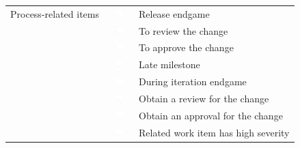 \begin{table}[t!]
\centering
\begin{tabular}{rll}
\toprule
Process-related items &\vspace{-2pt}\includegraphics[height=10px, width=30px]{figures/sparkles/during-release-endgame.pdf} & Release endgame\\
&\vspace{-2pt}\includegraphics[height=10px, width=30px]{figures/sparkles/you-need-to-review-a-change.pdf} & To review the change\\
&\vspace{-2pt}\includegraphics[height=10px, width=30px]{figures/sparkles/you-need-to-approve-a-change.pdf} & To approve the change\\
&\vspace{-2pt}\includegraphics[height=10px, width=30px]{figures/sparkles/late-milestone.pdf} & Late milestone\\
&\vspace{-2pt}\includegraphics[height=10px, width=30px]{figures/sparkles/during-iteration-endgame.pdf} & During iteration endgame\\
&\vspace{-2pt}\includegraphics[height=10px, width=30px]{figures/sparkles/you-need-a-review-for-a-change.pdf} & Obtain a review for the change\\
&\vspace{-2pt}\includegraphics[height=10px, width=30px]{figures/sparkles/you-need-an-approval-for-a-change.pdf} & Obtain an approval for the change\\
&\vspace{-2pt}\includegraphics[height=10px, width=30px]{figures/sparkles/related-work-item-has-high-severity.pdf} & Related work item has high severity\\

\end{tabular}
\end{table}
